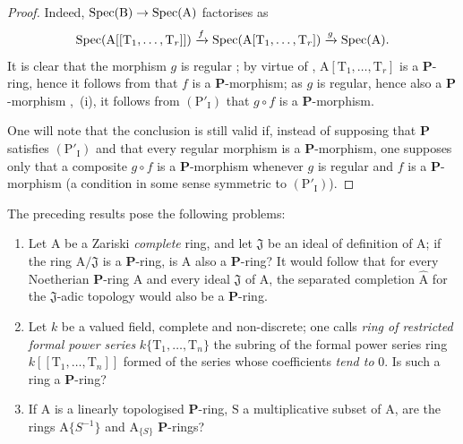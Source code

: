 \begin{proof}
Indeed, $\operatorname{Spec}(\mathrm{B})\to\operatorname{Spec}(\mathrm{A})$ factorises as
\[
  \operatorname{Spec}(\mathrm{A}[[\mathrm{T}_1,\ldots,\mathrm{T}_r]])\xrightarrow{f}\operatorname{Spec}(\mathrm{A}[\mathrm{T}_1,\ldots,\mathrm{T}_r])\xrightarrow{g}\operatorname{Spec}(\mathrm{A}).
\]
It is clear that the morphism $g$ is regular ; by virtue of , $\mathrm{A}[\mathrm{T}_1,\ldots,\mathrm{T}_r]$ is a $\boldsymbol{P}$-ring, hence it follows from  that $f$ is a $\boldsymbol{P}$-morphism; as $g$ is regular, hence also a $\boldsymbol{P}$-morphism ,~(i), it follows from $(\mathrm{P}'_\mathrm{I})$ that $g\circ f$ is a $\boldsymbol{P}$-morphism.

One will note that the conclusion is still valid if, instead of supposing that $\boldsymbol{P}$ satisfies $(\mathrm{P}'_\mathrm{I})$ and that every regular morphism is a $\boldsymbol{P}$-morphism, one supposes only that a composite $g\circ f$ is a $\boldsymbol{P}$-morphism whenever $g$ is regular and $f$ is a $\boldsymbol{P}$-morphism (a condition in some sense symmetric to $(\mathrm{P}'_\mathrm{I})$).
\end{proof}

\begin{remark}[7.4.8]
\label{IV.7.4.8}
The preceding results pose the following problems:
\begin{enumerate}[label=\rm\Alph*)]
  \item Let $\mathrm{A}$ be a Zariski \emph{complete} ring, and let $\mathfrak{J}$ be an ideal of definition of $\mathrm{A}$; if the ring $\mathrm{A}/\mathfrak{J}$ is a $\boldsymbol{P}$-ring, is $\mathrm{A}$ also a $\boldsymbol{P}$-ring?
  It would follow that for every Noetherian $\boldsymbol{P}$-ring $\mathrm{A}$ and every ideal $\mathfrak{J}$ of $\mathrm{A}$, the separated completion $\widehat{\mathrm{A}}$ for the $\mathfrak{J}$-adic topology would also be a $\boldsymbol{P}$-ring.
  \item Let $k$ be a valued field, complete and non-discrete; one calls \emph{ring of restricted formal power series} $k\{\mathrm{T}_1,\ldots,\mathrm{T}_n\}$ the subring of the formal power series ring $k[[\mathrm{T}_1,\ldots,\mathrm{T}_n]]$ formed of the series whose coefficients \emph{tend to} $0$.
  Is such a ring a $\boldsymbol{P}$-ring?
  \item If $\mathrm{A}$ is a linearly topologised $\boldsymbol{P}$-ring, $\mathrm{S}$ a multiplicative subset of $\mathrm{A}$, are the rings $\mathrm{A}\{S^{-1}\}$  and $\mathrm{A}_{\{S\}}$  $\boldsymbol{P}$-rings?
\end{enumerate}
\end{remark}


